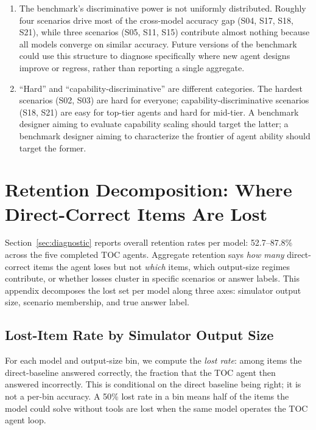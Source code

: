 \documentclass{article}
\begin{document}
\begin{enumerate}[leftmargin=*, itemsep=2pt]
    \item The benchmark's discriminative power is not uniformly distributed. Roughly four scenarios drive most of the cross-model accuracy gap (S04, S17, S18, S21), while three scenarios (S05, S11, S15) contribute almost nothing because all models converge on similar accuracy. Future versions of the benchmark could use this structure to diagnose specifically where new agent designs improve or regress, rather than reporting a single aggregate.
    \item ``Hard'' and ``capability-discriminative'' are different categories. The hardest scenarios (S02, S03) are hard for everyone; capability-discriminative scenarios (S18, S21) are easy for top-tier agents and hard for mid-tier. A benchmark designer aiming to evaluate capability scaling should target the latter; a benchmark designer aiming to characterize the frontier of agent ability should target the former.
\end{enumerate}

\section{Retention Decomposition: Where Direct-Correct Items Are Lost}
\label{sec:appendix-retention-decomp}

Section~\ref{sec:diagnostic} reports overall retention rates per model: 52.7--87.8\% across the five completed TOC agents. Aggregate retention says \emph{how many} direct-correct items the agent loses but not \emph{which} items, which output-size regimes contribute, or whether losses cluster in specific scenarios or answer labels. This appendix decomposes the lost set per model along three axes: simulator output size, scenario membership, and true answer label.

\subsection{Lost-Item Rate by Simulator Output Size}
\label{sec:appendix-lost-by-bin}

For each model and output-size bin, we compute the \emph{lost rate}: among items the direct-baseline answered correctly, the fraction that the TOC agent then answered incorrectly. This is conditional on the direct baseline being right; it is not a per-bin accuracy. A 50\% lost rate in a bin means half of the items the model could solve without tools are lost when the same model operates the TOC agent loop.
\end{document}
